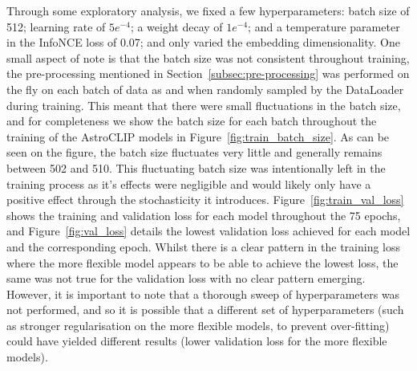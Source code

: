Through some exploratory analysis, we fixed a few hyperparameters: batch size of 512; learning rate of $5e^{-4}$; a weight
decay of $1e^{-4}$; and a temperature parameter in the InfoNCE loss of 0.07; and only varied the embedding dimensionality.
One small aspect of note is that the batch size was not consistent throughout training, the pre-processing mentioned in
Section~\eqref{subsec:pre-processing} was performed on the fly on each batch of data as and when randomly sampled by
the DataLoader during training.
This meant that there were small fluctuations in the batch size, and for completeness we show the batch size for each batch
throughout the training of the AstroCLIP models in Figure~\eqref{fig:train_batch_size}.
As can be seen on the figure, the batch size fluctuates very little and generally remains between 502 and 510.
This fluctuating batch size was intentionally left in the training process as it's effects were negligible and would likely
only have a positive effect through the stochasticity it introduces.
Figure~\eqref{fig:train_val_loss} shows the training and validation loss for each model throughout the 75 epochs, and
Figure~\eqref{fig:val_loss} details the lowest validation loss achieved for each model and the corresponding epoch.
Whilst there is a clear pattern in the training loss where the more flexible model appears to be able to achieve the
lowest loss, the same was not true for the validation loss with no clear pattern emerging.
However, it is important to note that a thorough sweep of hyperparameters was not performed, and so it is possible that
a different set of hyperparameters (such as stronger regularisation on the more flexible models, to prevent over-fitting)
could have yielded different results (lower validation loss for the more flexible models).
